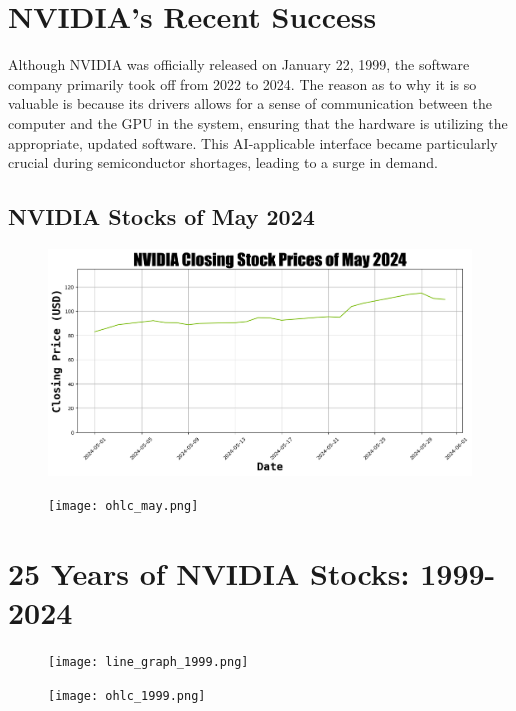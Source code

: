 \documentclass[article, 9pt]{extarticle}
\begin{document}
\section{NVIDIA's Recent Success}

Although NVIDIA was officially released on January 22, 1999, the software company primarily took off from 2022 to 2024. The reason as to why it is so valuable is because its drivers allows for a sense of communication between the computer and the GPU in the system, ensuring that the hardware is utilizing the appropriate, updated software. This AI-applicable interface became particularly crucial during semiconductor shortages, leading to a surge in demand. 

\subsection{NVIDIA Stocks of May 2024}

\begin{figure}[H]
        \centering
        \includegraphics[width=\linewidth]{line_graph_may.png}
    \end{figure}


\begin{figure}[H]
        \centering
        \texttt{[image: ohlc\_may.png]}
    \end{figure}


\section{25 Years of NVIDIA Stocks: 1999-2024}

\begin{figure}[H]
        \centering
        \texttt{[image: line\_graph\_1999.png]}
    \end{figure}


\begin{figure}[H]
        \centering
        \texttt{[image: ohlc\_1999.png]}
    \end{figure}
\end{document}
